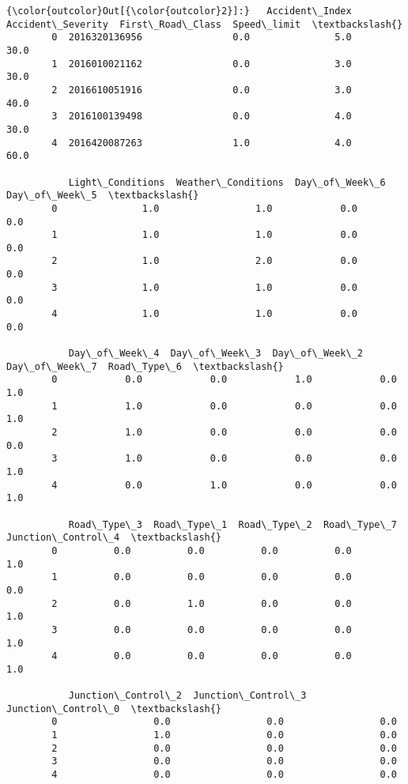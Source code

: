 \documentclass[11pt]{article}
\begin{document}
\begin{Verbatim}[commandchars=\\\{\}]
{\color{outcolor}Out[{\color{outcolor}2}]:}   Accident\_Index  Accident\_Severity  First\_Road\_Class  Speed\_limit  \textbackslash{}
        0  2016320136956                0.0               5.0         30.0   
        1  2016010021162                0.0               3.0         30.0   
        2  2016610051916                0.0               3.0         40.0   
        3  2016100139498                0.0               4.0         30.0   
        4  2016420087263                1.0               4.0         60.0   
        
           Light\_Conditions  Weather\_Conditions  Day\_of\_Week\_6  Day\_of\_Week\_5  \textbackslash{}
        0               1.0                 1.0            0.0            0.0   
        1               1.0                 1.0            0.0            0.0   
        2               1.0                 2.0            0.0            0.0   
        3               1.0                 1.0            0.0            0.0   
        4               1.0                 1.0            0.0            0.0   
        
           Day\_of\_Week\_4  Day\_of\_Week\_3  Day\_of\_Week\_2  Day\_of\_Week\_7  Road\_Type\_6  \textbackslash{}
        0            0.0            0.0            1.0            0.0          1.0   
        1            1.0            0.0            0.0            0.0          1.0   
        2            1.0            0.0            0.0            0.0          0.0   
        3            1.0            0.0            0.0            0.0          1.0   
        4            0.0            1.0            0.0            0.0          1.0   
        
           Road\_Type\_3  Road\_Type\_1  Road\_Type\_2  Road\_Type\_7  Junction\_Control\_4  \textbackslash{}
        0          0.0          0.0          0.0          0.0                 1.0   
        1          0.0          0.0          0.0          0.0                 0.0   
        2          0.0          1.0          0.0          0.0                 1.0   
        3          0.0          0.0          0.0          0.0                 1.0   
        4          0.0          0.0          0.0          0.0                 1.0   
        
           Junction\_Control\_2  Junction\_Control\_3  Junction\_Control\_0  \textbackslash{}
        0                 0.0                 0.0                 0.0   
        1                 1.0                 0.0                 0.0   
        2                 0.0                 0.0                 0.0   
        3                 0.0                 0.0                 0.0   
        4                 0.0                 0.0                 0.0   
        

\end{Verbatim}
\end{document}
